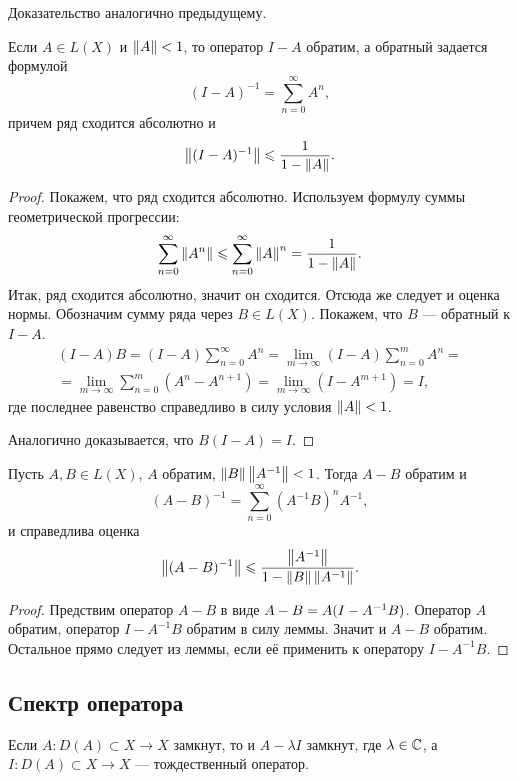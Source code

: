Доказательство аналогично предыдущему.

\begin{lemma}\label{le:neumann}
    Если $A \in L(X)$ и $\left\|A\right\| < 1$, то оператор $I - A$ обратим, а обратный задается формулой
    \[ (I - A)^{-1} = \sum_{n = 0}^\infty A^n, \]
    причем ряд сходится абсолютно и
    \[ \left\|(I-A)^{-1}\right\| \leqslant \frac{1}{1-\left\|A\right\|}. \]
\end{lemma}

\begin{proof}
    Покажем, что ряд сходится абсолютно. Используем формулу суммы геометрической прогрессии:
    \[ \sum_{n=0}^\infty \left\|A^n\right\| \leqslant \sum_{n=0}^\infty \left\|A\right\|^n = \frac{1}{1-\left\|A\right\|}. \]
    Итак, ряд сходится абсолютно, значит он сходится. Отсюда же следует и оценка нормы.
    Обозначим сумму ряда через $B \in L(X)$. Покажем, что $B$ --- обратный к $I - A$.
    \begin{multline*}
        (I - A)B = (I - A)\sum_{n=0}^\infty A^n = \lim_{m\to \infty} (I - A)\sum_{n=0}^m A^n = \\
            = \lim_{m \to \infty} \sum_{n=0}^m (A^n - A^{n+1}) = \lim_{m\to \infty} (I - A^{m+1})
            = I,
    \end{multline*}
    где последнее равенство справедливо в силу условия $\left\|A\right\| < 1$.

    Аналогично доказывается, что $B(I - A) = I$.
\end{proof}

\begin{theorem}
    Пусть $A, B \in L(X)$, $A$ обратим, $\left\|B\right\|\left\|A^{-1}\right\| < 1$. Тогда $A - B$ обратим и
    \[ (A-B)^{-1} = \sum_{n=0}^\infty (A^{-1}B)^n A^{-1}, \]
    и справедлива оценка
    \[ \left\|(A-B)^{-1}\right\| \leqslant \frac{\left\|A^{-1}\right\|}{1-\left\|B\right\|\left\|A^{-1}\right\|}. \]
\end{theorem}

\begin{proof}
    Предствим оператор $A-B$ в виде $A - B = A(I \hm- A^{-1}B)$. Оператор $A$ обратим, оператор
    $I-A^{-1}B$ обратим в силу леммы. Значит и $A - B$ обратим. Остальное прямо следует из леммы,
    если её применить к оператору $I-A^{-1}B$.
\end{proof}

\subsection{Спектр оператора}
\begin{lemma}
    Если $A \colon D(A) \subset X \to X$ замкнут, то и $A - \lambda I$ замкнут, 
    где $\lambda \in \mathbb{C}$, а $I \colon D(A) \subset X \to X$ --- тождественный оператор.
\end{lemma}

